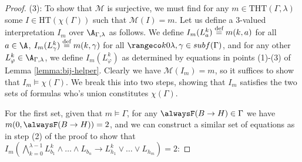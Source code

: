 \begin{proof}
  (3): To show that $\mathcal{M}$ is surjective, we must find for any
  $m \in \text{THT}(\Gamma,\lambda)$ some $I \in \text{HT}(\chi(\Gamma))$
  such that $\mathcal{M}(I) = m$. Let us define a 3-valued
  interpretation $I_m$ over $\A_{\Gamma,\lambda}$ as follows. We
  define $I_m(L_{a}^k) \stackrel{\text{def}}{=} m(k,a)$ for all $a \in \A$,
  $I_m(L^k_{\gamma}) \stackrel{\text{def}}{=} m(k,\gamma)$ for all
  $\kinlambda, \gamma \in subf(\Gamma)$, and for any other
  $L^k_\varphi \in \A_{\Gamma,\lambda}$, we define
  $I_m(L^k_{\varphi})$ as determined by equations in points (1)-(3) of
  Lemma \ref{lemma:bij-helper}. Clearly we have
  $\mathcal{M}(I_m) = m$, so it suffices to show that
  $I_m \models \chi(\Gamma)$. We break this into two steps, showing
  that $I_m$ satisfies the two sets of formulas who's union
  constitutes $\chi(\Gamma)$.

  For the first set, given that $m \models \Gamma$, for any
  $\tempruleshort \in \Gamma$ we have $m(0,\tempruleshort)=2$, and we
  can construct a similar set of equations as in step (2) of the proof
  to show that
  $I_m(\bigwedge_{k=0}^{\lambda-1} L_{b_1}^k \land \dots \land L_{b_n}
  \rightarrow L_{h_1}^k \lor \dots \lor L_{h_m}) = 2$:


\end{proof}
